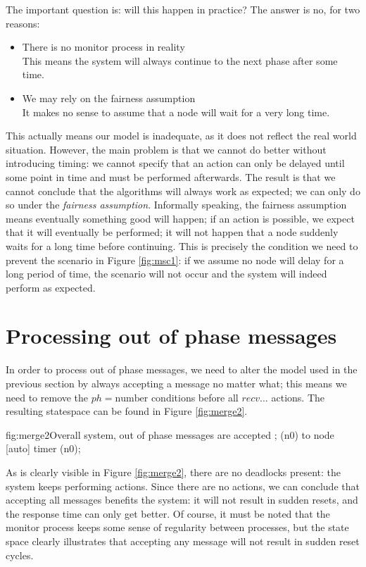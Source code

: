 The important question is: will this happen in practice? The answer is no, for two reasons:

\begin{itemize}
\item There is no monitor process in reality \\
This means the system will always continue to the next phase after some time.
\item We may rely on the fairness assumption \\
It makes no sense to assume that a node will wait for a very long time.
\end{itemize}

This actually means our model is inadequate, as it does not reflect the real world situation. However, the main problem is that we cannot do better without introducing timing: we cannot specify that an action can only be delayed until some point in time and must be performed afterwards.
The result is that we cannot conclude that the algorithms will always work as expected; we can only do so under the \emph{fairness assumption}. Informally speaking, the fairness assumption means eventually something good will happen; if an action is possible, we expect that it will eventually be performed; it will not happen that a node suddenly waits for a long time before continuing. This is precisely the condition we need to prevent the scenario in Figure \ref{fig:msc1}: if we assume no node will delay for a long period of time, the scenario will not occur and the system will indeed perform as expected.

\section{Processing out of phase messages}

In order to process out of phase messages, we need to alter the model used in the previous section by always accepting a message no matter what; this means we need to remove the $ph = \mbox{number}$ conditions before all $recv\dots$ actions. The resulting statespace can be found in Figure \ref{fig:merge2}.

\begin{statespace}{fig:merge2}{Overall system, out of phase messages are accepted}
 ;
  (n0) to node [auto] {timer} (n0);
\end{statespace}

As is clearly visible in Figure \ref{fig:merge2}, there are no deadlocks present: the system keeps performing  actions. Since there are no  actions, we can conclude that accepting all messages benefits the system: it will not result in sudden resets, and the response time can only get better. Of course, it must be noted that the monitor process keeps some sense of regularity between processes, but the state space clearly illustrates that accepting any message will not result in sudden reset cycles.

